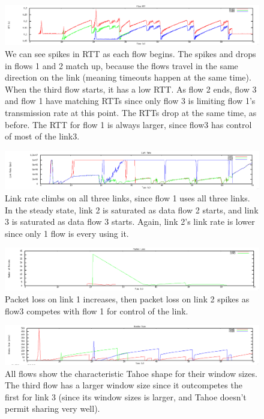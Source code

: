 \documentclass[12pt]{article}
\begin{document}
\begin{figure}[!ht]
\centering \includegraphics[bb= 0 0 1300 250, scale=.35]{figures/Test2_Tahoe/flow_rtt.png}
\caption{We can see spikes in RTT as each flow begins.  The spikes and drops in flows 1 and 2 match up, because the flows travel in the same direction on the link (meaning timeouts happen at the same time).  When the third flow starts, it has a low RTT.  As flow 2 ends, flow 3 and flow 1 have matching RTTs since only flow 3 is limiting flow 1’s transmission rate at this point.  The RTTs drop at the same time, as before.  The RTT for flow 1 is always larger, since flow3 has control of most of the link3.  }
\label{fig:test2_tahoe_flow_rtt}
\end{figure}

\begin{figure}[!ht]
\centering \includegraphics[bb= 0 0 1300 250, scale=.35]{figures/Test2_Tahoe/link_rate.png}
\caption{Link rate climbs on all three links, since flow 1 uses all three links.  In the steady state, link 2 is saturated as data flow 2 starts, and link 3 is saturated as data flow 3 starts.  Again, link 2’s link rate is lower since only 1 flow is every using it.}
\label{fig:test2_tahoe_link_rate}
\end{figure}

\begin{figure}[!ht]
\centering \includegraphics[bb= 0 0 1300 250, scale=.35]{figures/Test2_Tahoe/packet_loss.png}
\caption{Packet loss on link 1 increases, then packet loss on link 2 spikes as flow3 competes with flow 1 for control of the link.}
\label{fig:test2_tahoe_packet_loss}
\end{figure}

\begin{figure}[!ht]
\centering \includegraphics[bb= 0 0 1300 250, scale=.35]{figures/Test2_Tahoe/window_size.png}
\caption{All flows show the characteristic Tahoe shape for their window sizes.  The third flow has a larger window size since it outcompetes the first for link 3 (since its window sizes is larger, and Tahoe doesn’t permit sharing very well).}
\label{fig:test2_tahoe_window_size}
\end{figure}
\end{document}
